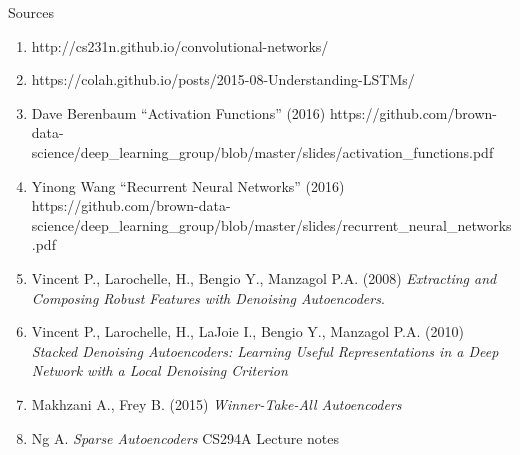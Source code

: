 \documentclass[pdf]{beamer}
\begin{document}
\begin{frame}{Sources}

	\begin{enumerate}[1]
	\item http://cs231n.github.io/convolutional-networks/
	\item https://colah.github.io/posts/2015-08-Understanding-LSTMs/
	\item Dave Berenbaum ``Activation Functions'' (2016) https://github.com/brown-data-science/deep\_learning\_group/blob/master/slides/activation\_functions.pdf
	\item Yinong Wang ``Recurrent Neural Networks'' (2016) https://github.com/brown-data-science/deep\_learning\_group/blob/master/slides/recurrent\_neural\_networks.pdf
	
	\item Vincent P., Larochelle, H., Bengio Y., Manzagol P.A. (2008) \textit{Extracting and Composing Robust Features with
Denoising Autoencoders}.
	
	\item Vincent P., Larochelle, H., LaJoie I., Bengio Y., Manzagol P.A. (2010) \textit{Stacked Denoising Autoencoders: Learning Useful Representations in a Deep Network with a Local Denoising Criterion}
	
	\item Makhzani A., Frey B. (2015) \textit{Winner-Take-All Autoencoders}
	
	\item Ng A. \textit{Sparse Autoencoders} CS294A Lecture notes
	\end{enumerate}
	

	\end{frame}
\end{document}
